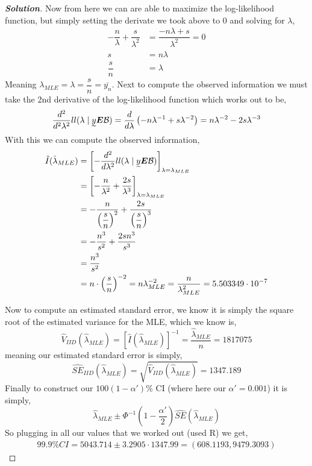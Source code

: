 \documentclass[12pt]{article}
\newcommand{\lrp}[1]{\left(#1\right)}
\newcommand{\lrb}[1]{\left[#1\right]}
\newenvironment{solution}{\begin{proof}[\textbf{\textit{Solution}}] }{\end{proof}}
\begin{document}
\begin{itemize}
\begin{itemize}
\begin{itemize}
\begin{tcolorbox}[breakable]
\begin{solution}
        Now from here we can are able to maximize the log-likelihood function, but simply setting the derivate we took above to 0 and solving for $\lambda$,
        \begin{align*}
            -\dfrac{n}{\lambda} + \dfrac{s}{\lambda^{2}} &= \dfrac{-n\lambda + s}{\lambda^{2}} = 0 \\
            s &= n\lambda \\
            \dfrac{s}{n} &= \lambda 
        \end{align*}
        Meaning $\lambda_{MLE} = \lambda = \dfrac{s}{n} = \bar{y_n}$. Next to compute the observed information we must take the 2nd derivative of the log-likelihood function which works out to be,
        \[\dfrac{d^{2}}{d^{2}\lambda^{2}}ll(\lambda \mid \undertilde{y}\bm{E}\mathcal{B}) = \dfrac{d}{d\lambda}\lrp{-n\lambda^{-1} + s\lambda^{-2}} = n\lambda^{-2} -2s\lambda^{-3}\]
        With this we can compute the observed information,
        \begin{align*}
            \hat{I}(\hat{\lambda}_{MLE}) &= \lrb{-\dfrac{d^{2}}{d\lambda^{2}} ll(\lambda \mid \undertilde{y}\bm{E}\mathcal{B})}_{\lambda = \lambda_{MLE}} \\ &=\lrb{-\dfrac{n}{\lambda^{2}} +\dfrac{2s}{\lambda^{3}}}_{\lambda = \lambda_{MLE}} \\
            &= -\dfrac{n}{\lrp{\dfrac{s}{n}}^{2}} + \dfrac{2s}{\lrp{\dfrac{s}{n}}^{3}} \\
            &= -\dfrac{n^{3}}{s^{2}} + \dfrac{2sn^{3}}{s^{3}} \\
            &= \dfrac{n^{3}}{s^{2}} \\
            &= n\cdot \lrp{\dfrac{s}{n}}^{-2} = n\lambda_{MLE}^{-2} = \dfrac{n}{\lambda_{MLE}^{2}} = 5.503349\cdot 10^{-7}
        \end{align*}
    
        Now to compute an estimated standard error, we know it is simply the square root of the estimated variance for the MLE, which we know is,
        \[\hat{V}_{IID}(\hat{\lambda}_{MLE}) = \lrb{\hat{I}(\hat{\lambda}_{MLE})}^{-1} = \dfrac{\hat{\lambda}_{MLE}}{n} = 1817075\]
        meaning our estimated standard error is simply, 
        \[\hat{SE}_{IID}(\hat{\lambda}_{MLE}) = \sqrt{\hat{V}_{IID}(\hat{\lambda}_{MLE}) } = 1347.189\]
        Finally to construct our $100(1-\alpha')\%$ CI (where here our $\alpha' = 0.001$) it is simply,
        \[\hat{\lambda }_{MLE} \pm \Phi^{-1}(1 - \frac{\alpha'}{2})\hat{SE}(\hat{\lambda}_{MLE})\]
        So plugging in all our values that we worked out (used R) we get,
        \begin{align*}
            99.9\%CI = 5043.714 \pm 3.2905\cdot 1347.99 = (608.1193, 9479.3093)
        \end{align*}
    

\end{solution}
\end{tcolorbox}
\end{itemize}
\end{itemize}
\end{itemize}
\end{document}
